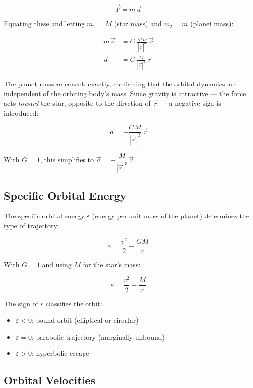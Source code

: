 \begin{equation}
\vec{F} = m\,\vec{a}
\end{equation}

Equating these and letting $m_1 = M$ (star mass) and $m_2 = m$ (planet mass):

\begin{align}
m\,\vec{a} &= G\,\frac{M\,m}{|\vec{r}|^3}\,\vec{r} \\[6pt]
\vec{a} &= G\,\frac{M}{|\vec{r}|^3}\,\vec{r}
\end{align}

The planet mass $m$ cancels exactly, confirming that the orbital dynamics are independent of the orbiting body's mass. Since gravity is attractive — the force acts \emph{toward} the star, opposite to the direction of $\vec{r}$ — a negative sign is introduced:

\begin{equation}
\boxed{\vec{a} = -\frac{GM}{|\vec{r}|^3}\,\vec{r}}
\end{equation}

With $G = 1$, this simplifies to $\vec{a} = -\dfrac{M}{|\vec{r}|^3}\,\vec{r}$.

\subsection{Specific Orbital Energy}

The specific orbital energy $\varepsilon$ (energy per unit mass of the planet) determines the type of trajectory:

\begin{equation}
\varepsilon = \frac{v^2}{2} - \frac{GM}{r}
\end{equation}

With $G = 1$ and using $M$ for the star's mass:

\begin{equation}
\varepsilon = \frac{v^2}{2} - \frac{M}{r}
\end{equation}

The sign of $\varepsilon$ classifies the orbit:
\begin{itemize}
    \item $\varepsilon < 0$: bound orbit (elliptical or circular)
    \item $\varepsilon = 0$: parabolic trajectory (marginally unbound)
    \item $\varepsilon > 0$: hyperbolic escape
\end{itemize}

\subsection{Orbital Velocities}

